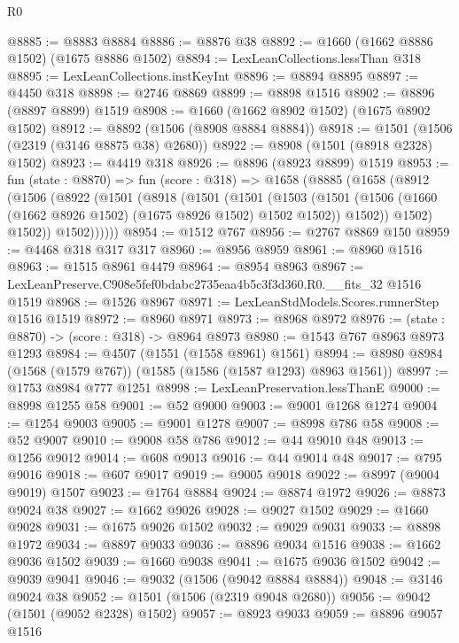 \begin{lexlean}{R0}
\begin{coremodule}
@8885 := @8883 @8884
@8886 := @8876 @38
@8892 := @1660 (@1662 @8886 @1502) (@1675 @8886 @1502)
@8894 := LexLeanCollections.lessThan @318
@8895 := LexLeanCollections.instKeyInt
@8896 := @8894 @8895
@8897 := @4450 @318
@8898 := @2746 @8869
@8899 := @8898 @1516
@8902 := @8896 (@8897 @8899) @1519
@8908 := @1660 (@1662 @8902 @1502) (@1675 @8902 @1502)
@8912 := @8892 (@1506 (@8908 @8884 @8884))
@8918 := @1501 (@1506 (@2319 (@3146 @8875 @38) @2680))
@8922 := @8908 (@1501 (@8918 @2328) @1502)
@8923 := @4419 @318
@8926 := @8896 (@8923 @8899) @1519
@8953 := fun (state : @8870) =>
  fun (score : @318) =>
  @1658
    (@8885
      (@1658
        (@8912
          (@1506
            (@8922
              (@1501
                (@8918
                  (@1501
                    (@1501
                      (@1503
                        (@1501
                          (@1506 (@1660 (@1662 @8926 @1502) (@1675 @8926 @1502) @1502 @1502))
                          @1502))
                      @1502)
                    @1502))
                @1502))))))
@8954 := @1512 @767
@8956 := @2767 @8869 @150
@8959 := @4468 @318 @317 @317
@8960 := @8956 @8959
@8961 := @8960 @1516
@8963 := @1515 @8961 @4479
@8964 := @8954 @8963
@8967 := LexLeanPreserve.C908e5fef0bdabc2735eaa4b5c3f3d360.R0.__fits_32 @1516 @1519
@8968 := @1526 @8967
@8971 := LexLeanStdModels.Scores.runnerStep @1516 @1519
@8972 := @8960 @8971
@8973 := @8968 @8972
@8976 := (state : @8870) -> (score : @318) -> @8964 @8973
@8980 := @1543 @767 @8963 @8973 @1293
@8984 := @4507 (@1551 (@1558 @8961) @1561)
@8994 := @8980 @8984 (@1568 (@1579 @767)) (@1585 (@1586 (@1587 @1293) @8963 @1561))
@8997 := @1753 @8984 @777 @1251
@8998 := LexLeanPreservation.lessThanE
@9000 := @8998 @1255 @58
@9001 := @52 @9000
@9003 := @9001 @1268 @1274
@9004 := @1254 @9003
@9005 := @9001 @1278
@9007 := @8998 @786 @58
@9008 := @52 @9007
@9010 := @9008 @58 @786
@9012 := @44 @9010 @48
@9013 := @1256 @9012
@9014 := @608 @9013
@9016 := @44 @9014 @48
@9017 := @795 @9016
@9018 := @607 @9017
@9019 := @9005 @9018
@9022 := @8997 (@9004 @9019) @1507
@9023 := @1764 @8884
@9024 := @8874 @1972
@9026 := @8873 @9024 @38
@9027 := @1662 @9026
@9028 := @9027 @1502
@9029 := @1660 @9028
@9031 := @1675 @9026 @1502
@9032 := @9029 @9031
@9033 := @8898 @1972
@9034 := @8897 @9033
@9036 := @8896 @9034 @1516
@9038 := @1662 @9036 @1502
@9039 := @1660 @9038
@9041 := @1675 @9036 @1502
@9042 := @9039 @9041
@9046 := @9032 (@1506 (@9042 @8884 @8884))
@9048 := @3146 @9024 @38
@9052 := @1501 (@1506 (@2319 @9048 @2680))
@9056 := @9042 (@1501 (@9052 @2328) @1502)
@9057 := @8923 @9033
@9059 := @8896 @9057 @1516

\end{coremodule}
\end{lexlean}
